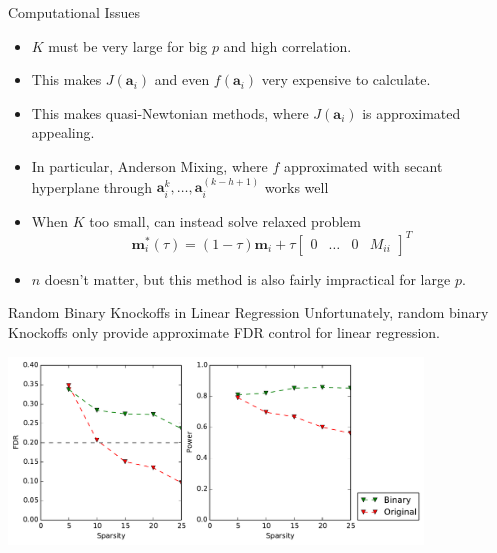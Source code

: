 \documentclass{beamer}
\begin{document}
\begin{frame}{Computational Issues}
    \begin{itemize}
        \item $K$ must be very large for big $p$ and high correlation.
        \item This makes $J\left( \mathbf a_i\right)$ and even $f\left(\mathbf a_i\right)$ very expensive to calculate.
        \item This makes quasi-Newtonian methods, where $J\left( \mathbf a_i\right)$ is approximated appealing.
        \item In particular, Anderson Mixing, where $f$ approximated with secant hyperplane through $\mathbf a_i^{k},\ldots,\mathbf a_i^{(k-h+1)}$ works well
        \item When $K$ too small, can instead solve relaxed problem
    \[\mathbf m_i^*(\tau) = (1-\tau)\mathbf m_i + \tau \left[ \begin{array}{cccc} 0 & \ldots & 0 & M_{ii} \end{array} \right]^T \]
        \item $n$ doesn't matter, but this method is also fairly impractical for large $p$.
    \end{itemize}
\end{frame}

\begin{frame}{Random Binary Knockoffs in Linear Regression}
    Unfortunately, random binary Knockoffs only provide approximate FDR control for linear regression. 
    \begin{center}
        \includegraphics[width=11cm]{images/lasso_FDR_power_50}
    \end{center}
\end{frame}
\end{document}
